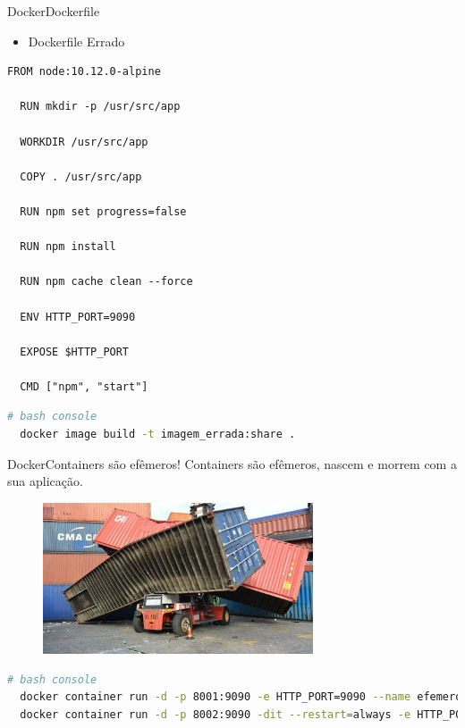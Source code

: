 \begin{frame}[fragile]{Docker}{Dockerfile}
  \begin{itemize}
    \item<1-> Dockerfile Errado
  \end{itemize}
  \begin{lstlisting}[language=docker]
  FROM node:10.12.0-alpine

  RUN mkdir -p /usr/src/app

  WORKDIR /usr/src/app

  COPY . /usr/src/app

  RUN npm set progress=false

  RUN npm install

  RUN npm cache clean --force

  ENV HTTP_PORT=9090

  EXPOSE $HTTP_PORT

  CMD ["npm", "start"]
  \end{lstlisting}
  \begin{lstlisting}[language=bash]
  # bash console
  docker image build -t imagem_errada:share .
  \end{lstlisting}
\end{frame}

\begin{frame}[fragile]{Docker}{Containers são efêmeros!}
  Containers são efêmeros, nascem e morrem com a sua aplicação.
  \begin{figure}[ht!]
    \centering
    \includegraphics[width=80mm]{images/efemeros.jpg}
  \end{figure}
  \begin{lstlisting}[language=bash]
  # bash console
  docker container run -d -p 8001:9090 -e HTTP_PORT=9090 --name efemero efemero:share
  docker container run -d -p 8002:9090 -dit --restart=always -e HTTP_PORT=9090 --name zumbi zumbi:share
  \end{lstlisting}
\end{frame}
